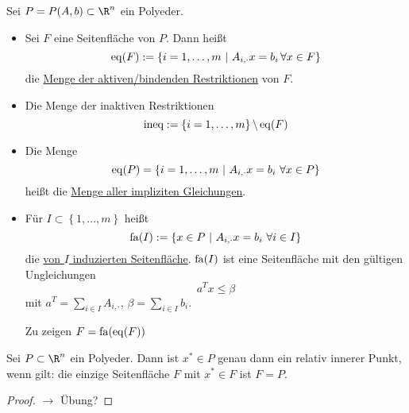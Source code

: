 \begin{definition}
  Sei $P = P(A,b) \subset \R^n$ ein Polyeder.
  \begin{itemize}
    \item Sei $F$ eine Seitenfläche von $P$. Dann heißt
      \begin{equation*}
        \eq(F):=\left\{ i = 1,\dots ,m\ |\ A_{i,\cdot}x = b_{i}\, \forall x \in F \right\}
      \end{equation*}
      die \underline{Menge der aktiven/bindenden Restriktionen} von $F$.
    \item Die Menge der inaktiven  Restriktionen
      \begin{equation*}
        \text{ineq}:= \left\{i=1,\dots ,m \right\}\backslash \operatorname{eq}(F)
      \end{equation*}
    \item Die Menge
      \begin{equation*}
        \operatorname{eq}(P) = \left\{ i =1,\dots ,m \ |\ A_{i,\cdot}x =b_{i} \ \forall x \in P \right\}
      \end{equation*}
      heißt die \underline{Menge aller impliziten Gleichungen}.
    \item Für $I \subset  \left\{ 1,\dots ,m \right\}$ heißt
      \begin{equation*}
        \fa(I):=\left\{x \in P \ |\ A_{i,\cdot}x = b_{i} \ \forall i \in I \right\}
      \end{equation*}
      die \underline{von $I$ induzierten Seitenfläche}.
      $\operatorname{fa}(I)$ ist eine Seitenfläche mit den gültigen Ungleichungen
      \begin{equation*}
        a^{T} x \leq \beta
      \end{equation*}
      mit $a^{T} = \sum\limits_{i \in I}^{} A_{i,\cdot}$, $\beta = \sum\limits_{i \in I}^{} b_{i}$.

      Zu zeigen $F = \operatorname{fa}(\operatorname{eq}(F))$
  \end{itemize}
\end{definition}
\begin{lemma}
	Sei $P\subset \R^n$ ein Polyeder. Dann ist $x^* \in P$ genau dann ein relativ innerer Punkt, wenn gilt: die einzige Seitenfläche $F$ mit $x^* \in F$ ist $F=P$.
\end{lemma}
\begin{proof}
	$\to$ Übung?
\end{proof}

